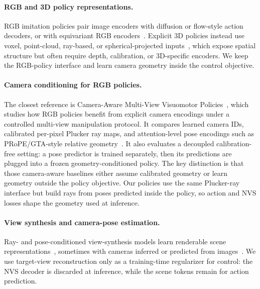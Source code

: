 \paragraph{RGB and 3D policy representations.}
RGB imitation policies pair image encoders with diffusion or flow-style action
decoders, or with equivariant RGB encoders~\citep{chi2023diffusionpolicy,yan2025maniflow,klee2026raven,hu2025spherical}.
Explicit 3D policies instead use voxel, point-cloud, ray-based,
or spherical-projected inputs~\citep{shridhar2023peract,goyal2023rvt,ze2024dp3,ke2024dda,yan2025maniflow,peri2024pcwm,wang2024equidiff,zhao2025hep,zhu2026equact,zhao2025gsl,klee2026raven,hu2025spherical},
which expose spatial structure but often require depth, calibration, or 3D-specific
encoders.  We keep the RGB-policy interface and learn camera geometry inside
the control objective.

\paragraph{Camera conditioning for RGB policies.}
The closest reference is Camera-Aware Multi-View Visuomotor
Policies~\citep{anonymous2026cameraaware}, which studies how RGB policies benefit
from explicit camera encodings under a controlled multi-view manipulation
protocol.  It compares learned camera IDs, calibrated per-pixel Plucker ray maps,
and attention-level pose encodings such as PRoPE/GTA-style relative
geometry~\citep{sitzmann2021lfn,li2025prope,miyato2024gta}.  It also evaluates a
decoupled calibration-free setting: a pose predictor is trained separately, then
its predictions are plugged into a frozen geometry-conditioned policy.  The key
distinction is that those camera-aware baselines either assume calibrated
geometry or learn geometry outside the policy objective.  Our policies use the
same Plucker-ray interface but build rays from poses predicted inside the
policy, so action and NVS losses shape the geometry used at inference.

\paragraph{View synthesis and camera-pose estimation.}
Ray- and pose-conditioned view-synthesis models learn renderable scene
representations~\citep{mildenhall2020nerf,sajjadi2022srt,jin2024lvsm,kim2026svsm,mitchel2026xfactor},
sometimes with cameras inferred or predicted from images~\citep{jiang2025rayzer,zhang2024camerasasrays,wang2024dust3r,leroy2024mast3r,wang2025vggt}.  We use
target-view reconstruction only as a training-time regularizer for control: the
NVS decoder is discarded at inference, while the scene tokens remain for action
prediction.

